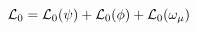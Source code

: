 \begin{equation}
{\cal L}_{0} = {\cal L}_{0}(\psi) + {\cal L}_{0}(\phi) + {\cal L}_{0} (\omega_{\mu}) \nonumber
\end{equation}

